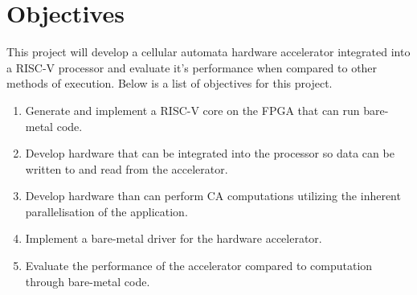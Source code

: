 \section{Objectives}
\label{sec:objectives}

This project will develop a cellular automata hardware accelerator integrated into a RISC\mbox{-}V processor and evaluate it’s performance when compared to other methods of execution. Below is a list of objectives for this project.

\begin{enumerate}
	\item Generate and implement a RISC\mbox{-}V core on the FPGA that can run bare\mbox{-}metal code.
	\item Develop hardware that can be integrated into the processor so data can be written to and read from the accelerator.
	\item Develop hardware than can perform CA computations utilizing the inherent parallelisation of the application.
	\item Implement a bare\mbox{-}metal driver for the hardware accelerator.
	\item Evaluate the performance of the accelerator compared to computation through bare\mbox{-}metal code.
\end{enumerate}